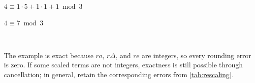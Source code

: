 $4 \equiv 1 \cdot 5 + 1 \cdot 1 + 1 \bmod 3$

$4 \equiv 7 \bmod 3$

$ $

The example is exact because $ra$, $r\Delta$, and $re$ are integers, so every rounding error is zero. If some scaled terms are not integers, exactness is still possible through cancellation; in general, retain the corresponding errors from \autoref{tab:rescaling}.









